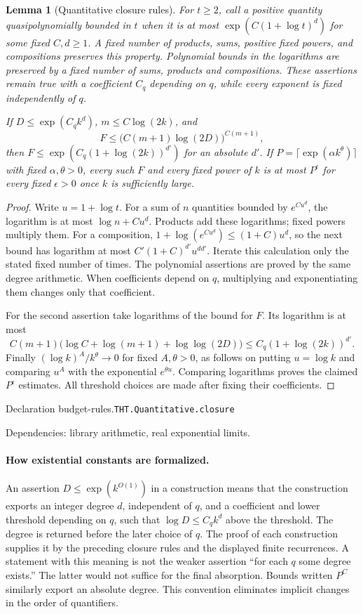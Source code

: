 \documentclass[11pt]{article}
\newtheorem{lemma}[theorem]{Lemma}
\theoremstyle{definition}
\numberwithin{equation}{section}
\newcommand{\bp}[3]{\par\smallskip\begingroup\footnotesize
\noindent\hypertarget{bp:#1}{\textsf{Declaration #1.}}\quad\nolinkurl{#2}\par
\noindent\textsf{Dependencies:} #3.\par\endgroup\smallskip}
\begin{document}
\begin{lemma}[Quantitative closure rules]\label{lem:budget-rules}
For $t\ge2$, call a positive quantity quasipolynomially bounded in $t$ when it is at most $\exp(C(1+\log t)^d)$ for some fixed $C,d\ge1$. A fixed number of products, sums, positive fixed powers, and compositions preserves this property. Polynomial bounds in the logarithms are preserved by a fixed number of sums, products and compositions. These assertions remain true with a coefficient $C_q$ depending on $q$, while every exponent is fixed independently of $q$.

If $D\le\exp(C_q k^d)$, $m\le C\log(2k)$, and
\[
 F\le\bigl(C(m+1)\log(2D)\bigr)^{C(m+1)},
\]
then $F\le\exp(C_q(1+\log(2k))^{d'})$ for an absolute $d'$. If $P=\lceil\exp(\alpha k^\theta)\rceil$ with fixed $\alpha,\theta>0$, every such $F$ and every fixed power of $k$ is at most $P^\epsilon$ for every fixed $\epsilon>0$ once $k$ is sufficiently large.
\end{lemma}
\begin{proof}
Write $u=1+\log t$. For a sum of $n$ quantities bounded by $e^{C u^d}$, the logarithm is at most $\log n+Cu^d$. Products add these logarithms; fixed powers multiply them. For a composition, $1+\log(e^{Cu^d})\le(1+C)u^d$, so the next bound has logarithm at most $C'(1+C)^{d'}u^{dd'}$. Iterate this calculation only the stated fixed number of times. The polynomial assertions are proved by the same degree arithmetic. When coefficients depend on $q$, multiplying and exponentiating them changes only that coefficient.

For the second assertion take logarithms of the bound for $F$. Its logarithm is at most
\[
 C(m+1)\bigl(\log C+\log(m+1)+\log\log(2D)\bigr)
 \le C_q(1+\log(2k))^{d'}.
\]
Finally $(\log k)^A/k^\theta\to0$ for fixed $A,\theta>0$, as follows on putting $u=\log k$ and comparing $u^A$ with the exponential $e^{\theta u}$. Comparing logarithms proves the claimed $P^\epsilon$ estimates. All threshold choices are made after fixing their coefficients.
\end{proof}
\bp{budget-rules}{THT.Quantitative.closure}{library arithmetic, real exponential limits}

\paragraph{How existential constants are formalized.}
An assertion $D\le\exp(k^{O(1)})$ in a construction means that the construction exports an integer degree $d$, independent of $q$, and a coefficient and lower threshold depending on $q$, such that $\log D\le C_q k^d$ above the threshold. The degree is returned before the later choice of $q$. The proof of each construction supplies it by the preceding closure rules and the displayed finite recurrences. A statement with this meaning is not the weaker assertion ``for each $q$ some degree exists.'' The latter would not suffice for the final absorption. Bounds written $P^C$ similarly export an absolute degree. This convention eliminates implicit changes in the order of quantifiers.
\end{document}
